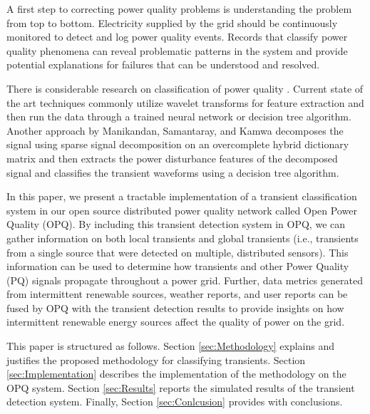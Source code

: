 \documentclass[10pt, conference, compsocconf]{IEEEtran}
\begin{document}
A first step to correcting power quality problems is understanding the problem from top to bottom. Electricity supplied by the grid should be continuously monitored to detect and log power quality events. Records that classify power quality phenomena can reveal problematic patterns in the system and provide potential explanations for failures that can be understood and resolved.

There is considerable research on classification of power quality \cite{Garrido:2014:PhenomenaClassification, Manikandan:2014:PQClassificationUsingSSD, Thirumala:2016:PQClassificationUsingWavelet, Rodriguez:2014:PQClassificationUsingANN, Tse:2012:PQClassificationUsingHHT}. Current state of the art techniques commonly utilize wavelet transforms for feature extraction and then run the data through a trained neural network or decision tree algorithm.  Another approach by Manikandan, Samantaray, and Kamwa \cite{Manikandan:2014:PQClassificationUsingSSD} decomposes the signal using sparse signal decomposition on an overcomplete hybrid dictionary matrix and then extracts the power disturbance features of the decomposed signal and classifies the transient waveforms using a decision tree algorithm.

In this paper, we present a tractable implementation of a transient classification system in our open source distributed power quality network called Open Power Quality (OPQ). By including this transient detection system in OPQ, we can gather information on both local transients and global transients (i.e., transients from a single source that were detected on multiple, distributed sensors). This information can be used to determine how transients and other Power Quality (PQ) signals propagate throughout a power grid. Further, data metrics generated from intermittent renewable sources, weather reports, and user reports can be fused by OPQ with the transient detection results to provide insights on how intermittent renewable energy sources affect the quality of power on the grid.

This paper is structured as follows. Section \ref{sec:Methodology} explains and justifies the proposed methodology for classifying transients. Section \ref{sec:Implementation} describes the implementation of the methodology on the OPQ system. Section \ref{sec:Results} reports the simulated results of the transient detection system. Finally, Section \ref{sec:Conlcusion} provides with conclusions.

\end{document}
